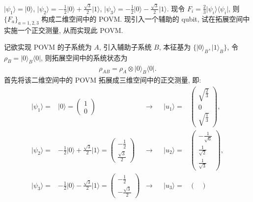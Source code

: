 \documentclass{assignment}
\begin{document}
\begin{probcontinued}{7}
    $\lvert\psi_1\rangle=\lvert 0\rangle$, $\lvert\psi_2\rangle=-\frac{1}{2}\lvert 0\rangle+\frac{\sqrt{3}}{2}\lvert 1\rangle$, $\lvert\psi_3\rangle=-\frac{1}{2}\lvert 0\rangle-\frac{\sqrt{3}}{2}\lvert 1\rangle$. 现令 $F_i=\frac{2}{3}\lvert\psi_i\rangle\langle\psi_i\rvert$, 则 $\{F_a\}_{a=1,2,3}$ 构成二维空间中的 POVM. 现引入一个辅助的 qubit, 试在拓展空间中实施一个正交测量, 从而实现此 POVM.
\end{probcontinued}
\begin{sol}
    记欲实现 POVM 的子系统为 $A$, 引入辅助子系统 $B$, 本征基为 $\{\lvert 0\rangle_B,\lvert 1\rangle_B\}$, 令 $\rho_B=\lvert 0\rangle_B\langle 0\rvert$, 则拓展空间中的系统状态为
    \begin{align}
        \rho_{AB}=\rho_A\otimes\lvert 0\rangle_B\langle 0\rvert.
    \end{align}
    首先将该二维空间中的 POVM 拓展成三维空间中的正交测量, 即:
    \begin{align}
        \lvert\psi_1\rangle=&\lvert 0\rangle=\begin{pmatrix}
            1\\
            0
        \end{pmatrix}&\longrightarrow&&\lvert u_1\rangle=&\begin{pmatrix}
            \sqrt{\frac{2}{3}}\\
            0\\
            \sqrt{\frac{1}{3}}
        \end{pmatrix},\\
        \lvert\psi_2\rangle=&-\frac{1}{2}\lvert 0\rangle+\frac{\sqrt{3}}{2}\lvert 1\rangle=\begin{pmatrix}
            -\frac{1}{2}\\
            \frac{\sqrt{3}}{2}
        \end{pmatrix}&\longrightarrow&&\lvert u_2\rangle=&\begin{pmatrix}
            -\frac{1}{\sqrt{6}}\\
            \frac{1}{\sqrt{2}}\\
            \frac{1}{\sqrt{3}}
        \end{pmatrix},\\
        \lvert\psi_3\rangle=&-\frac{1}{2}\lvert 0\rangle-\frac{\sqrt{3}}{2}\lvert 1\rangle=\begin{pmatrix}
            -\frac{1}{2}\\
            -\frac{\sqrt{3}}{2}
        \end{pmatrix}&\longrightarrow&&\lvert u_3\rangle=&\begin{pmatrix}

\end{pmatrix}
\end{align}
\end{sol}
\end{document}
